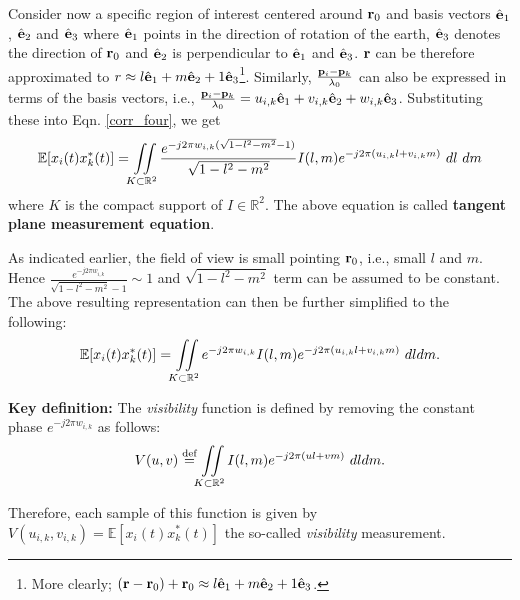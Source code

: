 \documentclass[aoas,preprint]{imsart}
\numberwithin{equation}{section}
\theoremstyle{plain}
\begin{document}
{Consider now a specific region of interest centered around ${\bf r}_0$ and basis vectors $\hat{{\bf e}}_1$, $\hat{{\bf e}}_2$ and $\hat{{\bf e}}_3$ where $\hat{{\bf e}}_1$ points in the direction of rotation of the earth, $\hat{{\bf e}}_3$ denotes the direction of ${\bf r}_0$ and $\hat{{\bf e}}_2$ is perpendicular to $\hat{{\bf e}}_1$ and $\hat{{\bf e}}_3$. ${\bf r}$ can be therefore approximated to $r \approx l\hat{{\bf e}}_1 + m\hat{{\bf e}}_2 +1\hat{{\bf e}}_3$\footnote{More clearly; $ ({\bf r}-{\bf r}_0) + {\bf r}_0 \approx l\hat{{\bf e}}_1 + m\hat{{\bf e}}_2 +1\hat{{\bf e}}_3$.}. Similarly, $\frac{{\bf p}_i -{\bf p}_k}{\lambda_0}$ can also be expressed in terms of the basis vectors, i.e., $\frac{{\bf p}_i -{\bf p}_k}{\lambda_0} = u_{i,k}\hat{{\bf e}}_1+v_{i,k}\hat{{\bf e}}_2+w_{i,k}\hat{{\bf e}}_3$. Substituting these into Eqn. \ref{corr_four}, we get
\begin{equation}
 \mathbb{E}[x_i(t)x^*_k(t)] =   \iint\displaylimits_{K\subset \mathbb{R}^2} \frac{e^{-j2\pi w_{i,k} (\sqrt{1-l^2-m^2}-1)}}{\sqrt{1-l^2-m^2}} {I}(l,m)e^{-j2\pi (u_{i,k}l+v_{i,k}m)} \   dl\ dm \label{tangent_plane}
\end{equation}
where $K$ is the compact support of $I \in \mathbb{R}^2$. The above equation is called {\bf tangent plane measurement equation}.
\vspace{0.5em}

As indicated earlier, the field of view is small pointing ${\bf r}_0$, i.e., small $l$ and $m$. Hence $\frac{e^{-j2\pi w_{i,k} }}{\sqrt{1-l^2-m^2}-1} \sim 1$ and $\sqrt{1-l^2-m^2}$ term can be assumed to be constant. The above resulting representation can then be further simplified to the following:
\begin{equation}
 \mathbb{E}[x_i(t)x^*_k(t)] =   \iint\displaylimits_{K\subset \mathbb{R}^2} e^{-j2\pi w_{i,k}}{I}(l,m) e^{-j2\pi (u_{i,k}l+v_{i,k}m)} \   dldm.
\end{equation}

{\bf{Key definition:}} The {\it{visibility}} function is defined by removing the constant phase $e^{-j2\pi w_{i,k}}$ as follows:
\begin{equation}
V(u, v) \stackrel{{\text{def}}}{=} \iint\displaylimits_{K\subset \mathbb{R}^2} {I}(l, m)e^{-j2\pi (ul+vm)}\ dldm.
\end{equation}

Therefore, each sample of this function is given by $V(u_{i,k}, v_{i,k}) = \mathbb{E}[x_i(t)x^*_k(t)]$ the so-called {\it{visibility}} measurement. 
\vspace{0.5em}

}
\end{document}
